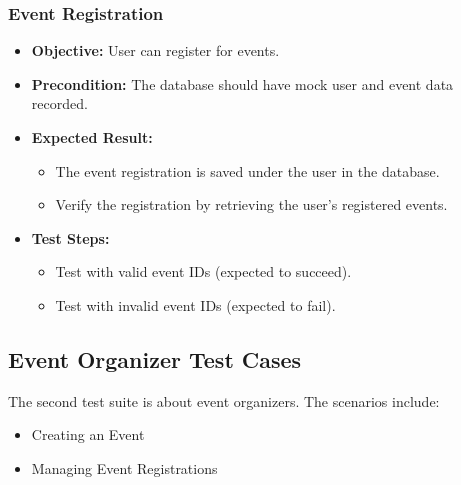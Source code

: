 \subsubsection{Event Registration}
\begin{itemize}
    \item \textbf{Objective:} User can register for events.
    \item \textbf{Precondition:} The database should have mock user and event data recorded.
    \item \textbf{Expected Result:} 
    \begin{itemize}
        \item The event registration is saved under the user in the database.
        \item Verify the registration by retrieving the user's registered events.
    \end{itemize}
    \item \textbf{Test Steps:}
    \begin{itemize}
        \item Test with valid event IDs (expected to succeed).
        \item Test with invalid event IDs (expected to fail).
    \end{itemize}
\end{itemize}


\subsection{Event Organizer Test Cases} The second test suite is about event organizers. The scenarios include: \begin{itemize} \item Creating an Event \item Managing Event Registrations \end{itemize}

\vspace{1cm}

